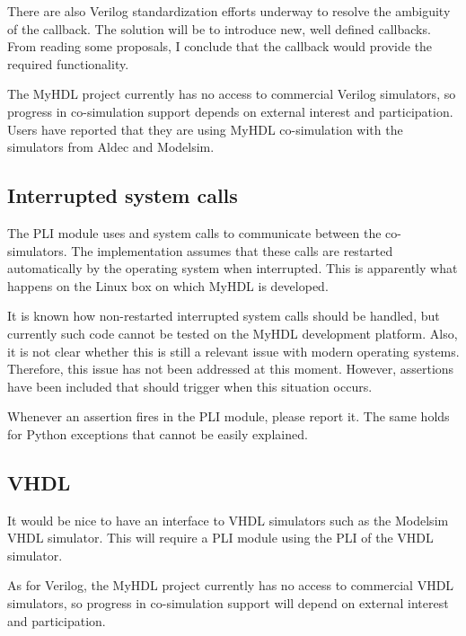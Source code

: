There are also Verilog standardization efforts underway to resolve the
ambiguity of the  callback. The solution will be
to introduce new, well defined callbacks. From reading some proposals,
I conclude that the  callback would provide the
required functionality.

The MyHDL project currently has no access to commercial Verilog
simulators, so progress in co-simulation support depends on external
interest and participation. Users have reported that they are using
MyHDL co-simulation with the simulators from Aldec and Modelsim.


\subsection{Interrupted system calls \label{cosim-impl-syscalls}}

The PLI module uses  and  system calls to
communicate between the co-simulators. The implementation assumes that
these calls are restarted automatically by the operating system when
interrupted. This is apparently what happens on the Linux box on which
MyHDL is developed.

It is known how non-restarted interrupted system calls should be
handled, but currently such code cannot be tested on the MyHDL
development platform. Also, it is not clear whether this is still a
relevant issue with modern operating systems. Therefore, this issue
has not been addressed at this moment. However, assertions have been
included that should trigger when this situation occurs.

Whenever an assertion fires in the PLI module, please report it.  The
same holds for Python exceptions that cannot be easily explained.

\subsection{VHDL \label{cosim-impl-vhdl}}

It would be nice to have an interface to VHDL simulators such as the
Modelsim VHDL simulator. This will require a PLI module using the
PLI of the VHDL simulator. 

As for Verilog, the MyHDL project currently has no access to commercial VHDL
simulators, so progress in co-simulation support will depend on
external interest and participation.
